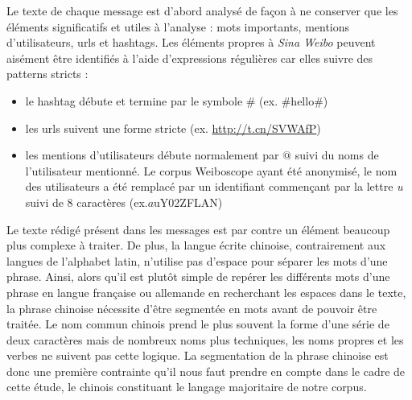     Le texte de chaque message est d'abord analysé de fa\c{c}on à ne conserver que les éléments significatifs et utiles à l'analyse : mots importants, mentions d'utilisateurs, urls et hashtags. Les éléments propres à \textit{Sina Weibo} peuvent aisément être identifiés à l'aide d'expressions régulières car elles suivre des patterns stricts : 

    \begin{itemize}
     \item le hashtag débute et termine par le symbole \# (ex. \#hello\#)
     \item les urls suivent une forme stricte (ex. \url{http://t.cn/SVWAfP}) 
     \item les mentions d'utilisateurs débute normalement par $@$ suivi du noms de l'utilisateur mentionné. Le corpus Weiboscope ayant été anonymisé, le nom des utilisateurs a été remplacé par un identifiant commençant par la lettre \textit{u} suivi de 8 caractères (ex.$a$uY02ZFLAN)
    \end{itemize}


    Le texte rédigé présent dans les messages est par contre un élément beaucoup plus complexe à traiter. De plus, la langue écrite chinoise, contrairement aux langues de l'alphabet latin, n'utilise pas d'espace pour séparer les mots d'une phrase. Ainsi, alors qu'il est plutôt simple de repérer les différents mots d'une phrase en langue française ou allemande en recherchant les espaces dans le texte, la phrase chinoise nécessite d'être segmentée en mots avant de pouvoir être traitée. Le nom commun chinois prend  le plus souvent la forme d'une série de deux caractères mais de nombreux noms plus techniques, les noms propres et les verbes ne suivent pas cette logique. La segmentation de la phrase chinoise est donc une  première contrainte qu'il nous faut prendre en compte dans le cadre de cette étude, le chinois constituant le langage majoritaire de notre corpus. 

